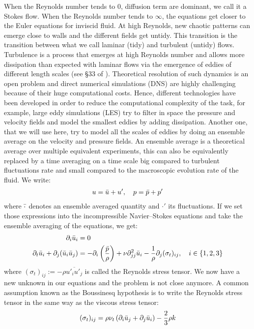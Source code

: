 \begin{subappendices}
	When the Reynolds number tends to $0$, diffusion term are dominant, we call it a Stokes flow. When the Reynolds number tends to $\infty$, the equations get closer to the Euler equations for inviscid fluid. At high Reynolds, new chaotic patterns can emerge close to walls and the different fields get untidy. This transition is the transition between what we call laminar (tidy) and turbulent (untidy) flows. Turbulence is a process that emerges at high Reynolds number and allows more dissipation than expected with laminar flows via the emergence of eddies of different length scales (see §33 of \cite{landau}). Theoretical resolution of such dynamics is an open problem and direct numerical simulations (DNS) are highly challenging because of their huge computational costs. Hence, different technologies have been developed in order to reduce the computational complexity of the task, for example, large eddy simulations (LES) try to filter in space the pressure and velocity fields and model the smallest eddies by adding dissipation. Another one, that we will use here, try to model all the scales of eddies by doing an ensemble average on the velocity and pressure fields. An ensemble average is a theoretical average over multiple equivalent experiments, this can also be equivalently replaced by a time averaging on a time scale big compared to turbulent fluctuations rate and small compared to the macroscopic evolution rate of the fluid. We write:
	\begin{align}
		u = \Bar{u} + u', \quad p = \Bar{p} + p'
	\end{align}
	where $\Bar{\cdot}$ denotes an ensemble averaged quantity and $\cdot '$ its fluctuations. If we set those expressions into the incompressible Navier–Stokes equations and take the ensemble averaging of the equations, we get:
	\begin{align}
		\partial_i \Bar{u}_i &= 0 \\
		\partial_t\Bar{u}_i + \partial_j(\Bar{u}_i\Bar{u}_j) &= -\partial_i\left(\frac{\Bar{p}}{\rho}\right) + \nu\partial^2_{jj}\Bar{u}_i - \frac{1}{\rho}\partial_j (\sigma_t)_{ij}, \quad i\in\{1,2,3\}
	\end{align}
	where $(\sigma_t)_{ij} := -\rho\overline{u'_i u'_j}$ is called the Reynolds stress tensor. We now have a new unknown in our equations and the problem is not close anymore. A common assumption known as the Boussinesq hypothesis is to write the Reynolds stress tensor in the same way as the viscous stress tensor:
	\begin{align}
		(\sigma_t)_{ij} &= \rho\nu_t\left(\partial_i\Bar{u}_j + \partial_j\Bar{u}_i\right) - \frac{2}{3}\rho k \\

\end{align}
\end{subappendices}
